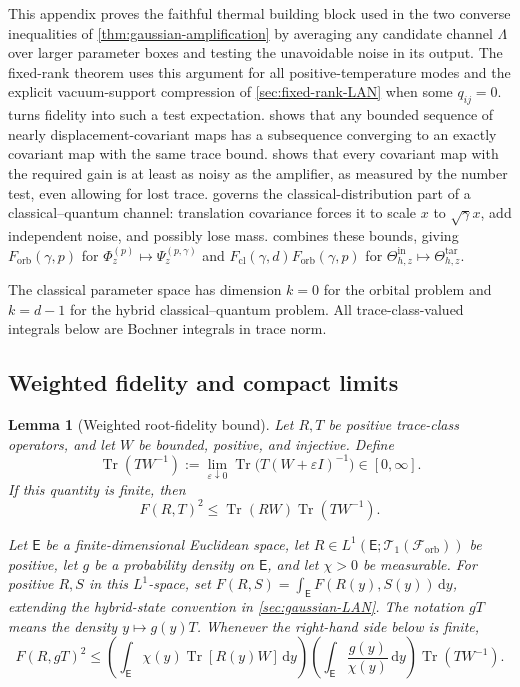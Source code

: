 \documentclass[11pt]{article}
\newtheorem{lemma}[lemma]{Lemma}
\theoremstyle{remark}
\theoremstyle{plain}
\newcommand{\cF}{\mathcal F}
\newcommand{\cT}{\mathcal T}
\newcommand{\dd}{\mathrm d}
\newcommand{\Tr}{\operatorname{Tr}}
\newcommand{\Forb}{F_{\mathrm{orb}}}
\newcommand{\Fcl}{F_{\mathrm{cl}}}
\begin{document}
This appendix proves the faithful thermal building block used in the two
converse inequalities of \cref{thm:gaussian-amplification} by averaging any
candidate channel \(\Lambda\) over
larger parameter boxes and testing the unavoidable noise in its output.
The fixed-rank theorem uses this argument for all positive-temperature modes
and the explicit vacuum-support compression of
\cref{sec:fixed-rank-LAN} when some \(q_{ij}=0\).
 turns fidelity into such a test expectation.
 shows that any bounded sequence of
nearly displacement-covariant maps has a subsequence converging to an exactly
covariant map with the same trace bound.
 shows that every covariant map with
the required gain is at least as noisy as the amplifier, as measured by the
number test, even allowing for lost trace.  
governs the classical-distribution part of a classical--quantum channel:
translation covariance forces it to scale \(x\) to \(\sqrt\gamma x\), add
independent noise, and possibly lose mass.
 combines these bounds, giving
\(\Forb(\gamma,p)\) for
\(\Phi_z^{(p)}\mapsto\Psi_z^{(p,\gamma)}\) and
\(\Fcl(\gamma,d)\Forb(\gamma,p)\) for
\(\Theta_{h,z}^{\mathrm{in}}\mapsto\Theta_{h,z}^{\mathrm{tar}}\).

The classical parameter space has
dimension \(k=0\) for the orbital problem and \(k=d-1\) for the hybrid
classical--quantum problem.
All trace-class-valued integrals below are Bochner integrals in trace norm.

\subsection{Weighted fidelity and compact limits}

\begin{lemma}[Weighted root-fidelity bound]\label{lem:weighted-fidelity}
Let \(R,T\) be positive trace-class operators, and let \(W\) be bounded,
positive, and injective.  Define
\[
  \Tr(TW^{-1})
  :=\lim_{\varepsilon\downarrow0}
  \Tr\bigl(T(W+\varepsilon I)^{-1}\bigr)\in[0,\infty].
\]
If this quantity is finite, then
\begin{equation}\label{eq:weighted-quantum-fidelity}
  F(R,T)^2\le\Tr(RW)\Tr(TW^{-1}).
\end{equation}

Let \(\mathsf E\) be a finite-dimensional Euclidean space,
let \(R\in L^1(\mathsf E;\cT_1(\cF_{\mathrm{orb}}))\) be positive, let
\(g\) be a probability density on \(\mathsf E\), and let \(\chi>0\) be
measurable.  For positive \(R,S\) in this \(L^1\)-space, set
\(F(R,S)=\int_{\mathsf E}F(R(y),S(y))\,\dd y\), extending the hybrid-state
convention in \cref{sec:gaussian-LAN}.
The notation \(gT\) means the density \(y\mapsto g(y)T\).
Whenever the right-hand side below is finite,
\begin{equation}\label{eq:weighted-hybrid-fidelity}
  F(R,gT)^2
  \le
  \left(\int_{\mathsf E}\chi(y)\Tr[R(y)W] \,\dd y\right)
  \left(\int_{\mathsf E}\frac{g(y)}{\chi(y)}\,\dd y\right)
  \Tr(TW^{-1}).
\end{equation}
\end{lemma}
\end{document}
